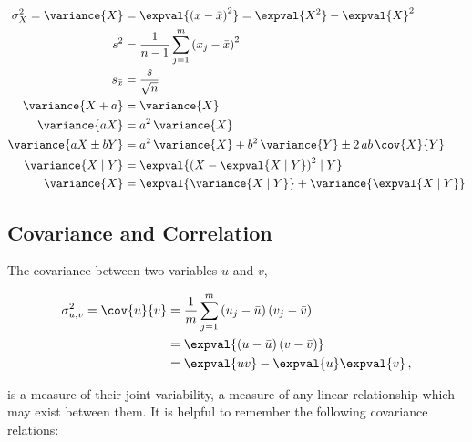 \begin{subequations}\label{eq:stats:var_relations}
\begin{align}
\sigma_{X}^{2} = \variance{X} &= \expval{\left(x-\bar{x}\right)^{2}} = \expval{X^{2}} - \expval{X}^{2} \label{eq:stats:var_relations:def} \\
s^{2} &= \frac{1}{n-1} \sum_{j=1}^{m} \left( x_{j} - \bar{x}\right)^{2} \label{eq:stats:var_relations:sample} \\
s_{\bar{x}} &= \frac{s}{\sqrt{n}} \label{eq:stats:var_relations:standard_error_of_mean} \\
\variance{X+a} &= \variance{X} \label{eq:stats:var_relations:add} \\
\variance{a X} &= a^{2} \, \variance{X} \label{eq:stats:var_relations:mult} \\
\variance{a X \pm b Y} &= a^{2} \, \variance{X} + b^{2} \, \variance{Y} \pm 2 \, ab \, \cov{X}{Y} \label{eq:stats:var_relations:linear} \\
\variance{X \mid Y} &= \expval{\left(X - \expval{X \mid Y}\right)^{2} \mid Y} \label{eq:stats:var_relations:conditional1} \\
\variance{X} &= \expval{\variance{X \mid Y}} + \variance{\expval{X \mid Y}} \label{eq:stats:var_relations:conditional2}
\end{align}
\end{subequations}



\subsection{Covariance and Correlation}
\label{additional:stats:corr_covar}

The covariance between two variables $u$ and $v$,

\begin{equation}\label{eq:stats:covar}
\begin{split}
\sigma_{u,v}^{2} = \cov{u}{v} &= \frac{1}{m}\sum_{j=1}^{m}\left(u_{j}-\bar{u}\right)\left(v_{j}-\bar{v}\right) \\
&= \expval{\left(u-\bar{u}\right)\left(v-\bar{v}\right)} \\
&= \expval{u v} - \expval{u}\expval{v}\,,
\end{split}
\end{equation}

\noindent is a measure of their joint variability,
\ie a measure of any linear relationship which may exist between them.
It is helpful to remember the following covariance relations:

